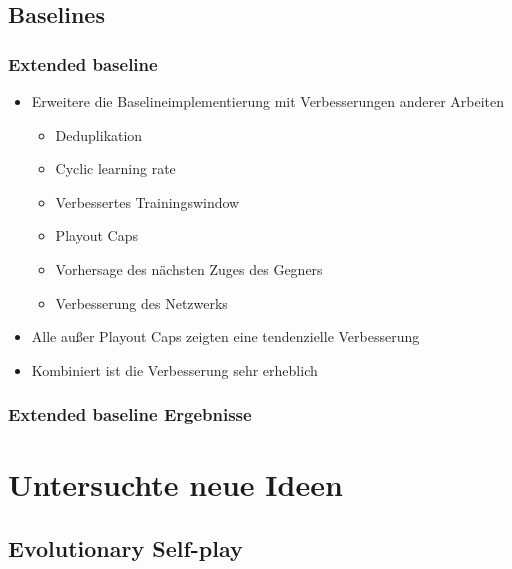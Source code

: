 \subsection{Baselines}



\begin{frame}
 \frametitle{Extended baseline}
  


\begin{itemize}
  \item \pause Erweitere die Baselineimplementierung mit Verbesserungen anderer Arbeiten
\begin{itemize}
  \item \pause Deduplikation
  \item \pause Cyclic learning rate
  \item \pause Verbessertes Trainingswindow
  \item \pause Playout Caps
  \item \pause Vorhersage des nächsten Zuges des Gegners
  \item \pause Verbesserung des Netzwerks
\end{itemize}
\end{itemize}

\begin{itemize}
  \item \pause Alle außer Playout Caps zeigten eine tendenzielle Verbesserung
  \item \pause Kombiniert ist die Verbesserung sehr erheblich
\end{itemize}

  
\end{frame}
\begin{frame}
 \frametitle{Extended baseline Ergebnisse}
  



  
\end{frame}

\section{Untersuchte neue Ideen}




\subsection{Evolutionary Self-play}



